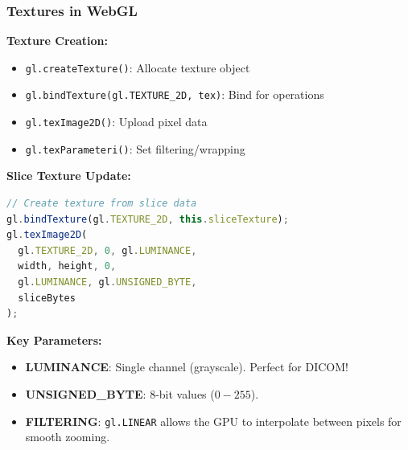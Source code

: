 \begin{frame}
\frametitle{Textures in WebGL}

\textbf{Texture Creation:}
\begin{itemize}
  \item \texttt{gl.createTexture()}: Allocate texture object
  \item \texttt{gl.bindTexture(gl.TEXTURE\_2D, tex)}: Bind for operations
  \item \texttt{gl.texImage2D()}: Upload pixel data
  \item \texttt{gl.texParameteri()}: Set filtering/wrapping
\end{itemize}

\vspace{0.3cm}

\textbf{Slice Texture Update:}
\begin{lstlisting}[language=JavaScript, basicstyle=\small\ttfamily]
// Create texture from slice data
gl.bindTexture(gl.TEXTURE_2D, this.sliceTexture);
gl.texImage2D(
  gl.TEXTURE_2D, 0, gl.LUMINANCE,
  width, height, 0,
  gl.LUMINANCE, gl.UNSIGNED_BYTE,
  sliceBytes
);
\end{lstlisting}

\vspace{0.3cm}

\textbf{Key Parameters:}
\begin{itemize}
  \item \textbf{LUMINANCE}: Single channel (grayscale). Perfect for DICOM!
  \item \textbf{UNSIGNED\_BYTE}: 8-bit values ($0-255$).
  \item \textbf{FILTERING}: \texttt{gl.LINEAR} allows the GPU to interpolate between pixels for smooth zooming.
\end{itemize}
\end{frame}

